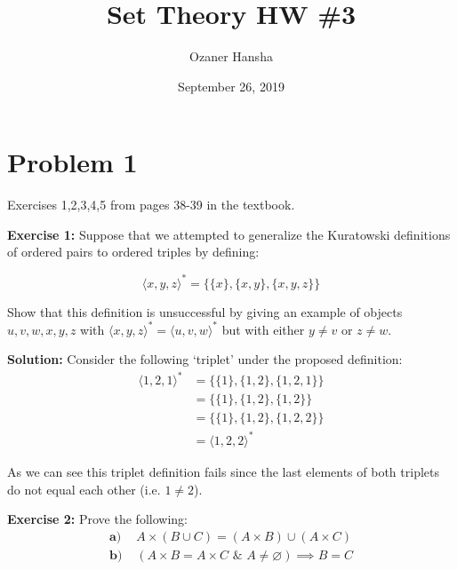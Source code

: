 \documentclass{article}
\begin{document}
\title{Set Theory HW \#3}
\author{Ozaner Hansha}
\date{September 26, 2019}
\maketitle

\newcommand{\pset}[1]{\mathfrak P#1}
\newcommand{\psetp}[1]{\mathfrak P(#1)}
\renewcommand{\wedge}{\,\,\&\,\,}
\renewcommand{\vee}{\text{ or }}
\newcommand{\pair}[2]{\langle#1,#2\rangle}
\newcommand{\triplet}[3]{\langle#1,#2,#3\rangle}
\renewcommand{\setminus}{-}


\section*{Problem 1}
Exercises 1,2,3,4,5 from pages 38-39 in the textbook.
\bigskip

\noindent\textbf{Exercise 1:} Suppose that we attempted to generalize the Kuratowski definitions of ordered pairs to ordered triples by defining:

\begin{equation*}
    \triplet{x}{y}{z}^*=\{\{x\},\{x,y\},\{x,y,z\}\}
\end{equation*}

Show that this definition is unsuccessful by giving an example of objects $u,v,w,x,y,z$ with $\triplet{x}{y}{z}^*=\triplet{u}{v}{w}^*$ but with either $y\not=v$ or $z\not=w$.
\bigskip

\noindent\textbf{Solution:} Consider the following {\lq triplet\rq} under the proposed definition:
\begin{align*}
    \triplet{1}{2}{1}^*&=\{\{1\},\{1,2\},\{1,2,1\}\}\\
    &=\{\{1\},\{1,2\},\{1,2\}\}\\
    &=\{\{1\},\{1,2\},\{1,2,2\}\}\\
    &=\triplet{1}{2}{2}^*
\end{align*}

As we can see this triplet definition fails since the last elements of both triplets do not equal each other (i.e. $1\not=2$).
\bigskip

\noindent\textbf{Exercise 2:} Prove the following:
\begin{align*}
    \textbf{a) }&A\times(B\cup C)=(A\times B)\cup (A\times C)\\
    \textbf{b) }&(A\times B=A\times C \wedge A\not=\varnothing)\implies B=C
\end{align*}
\end{document}
